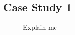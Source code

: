 \subsection{Case Study 1}

\begin{figure}[h]
\centering
\caption{Explain me}
\label{FigChangeMe}
\end{figure}

